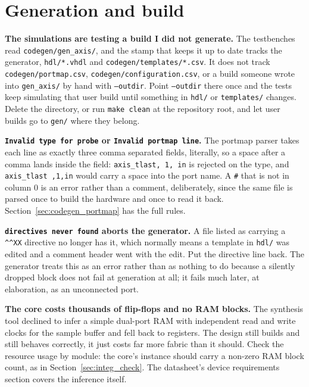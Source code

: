 \documentclass[../manual.tex]{subfiles}
\begin{document}
\section{Generation and build}
\label{sec:tr_build}

\textbf{The simulations are testing a build I did not generate.} The testbenches read \texttt{codegen/gen\_axis/}, and the stamp that keeps it up to date tracks the generator, \texttt{hdl/*.vhdl} and \texttt{codegen/templates/*.csv}. It does not track \texttt{codegen/portmap.csv}, \texttt{codegen/configuration.csv}, or a build someone wrote into \texttt{gen\_axis/} by hand with \texttt{--outdir}. Point \texttt{--outdir} there once and the tests keep simulating that user build until something in \texttt{hdl/} or \texttt{templates/} changes. Delete the directory, or run \texttt{make clean} at the repository root, and let user builds go to \texttt{gen/} where they belong.

\textbf{\texttt{Invalid type for probe} or \texttt{Invalid portmap line}.} The portmap parser takes each line as exactly three comma separated fields, literally, so a space after a comma lands inside the field: \texttt{axis\_tlast, 1, in} is rejected on the type, and \texttt{axis\_tlast ,1,in} would carry a space into the port name. A \texttt{\#} that is not in column 0 is an error rather than a comment, deliberately, since the same file is parsed once to build the hardware and once to read it back. Section~\ref{sec:codegen_portmap} has the full rules.

\textbf{\texttt{directives never found} aborts the generator.} A file listed as carrying a \texttt{\^{}\^{}XX} directive no longer has it, which normally means a template in \texttt{hdl/} was edited and a comment header went with the edit. Put the directive line back. The generator treats this as an error rather than as nothing to do because a silently dropped block does not fail at generation at all; it fails much later, at elaboration, as an unconnected port.

\textbf{The core costs thousands of flip-flops and no RAM blocks.} The synthesis tool declined to infer a simple dual-port RAM with independent read and write clocks for the sample buffer and fell back to registers. The design still builds and still behaves correctly, it just costs far more fabric than it should. Check the resource usage by module: the core's instance should carry a non-zero RAM block count, as in Section~\ref{sec:integ_check}. The datasheet's device requirements section covers the inference itself.
\end{document}
